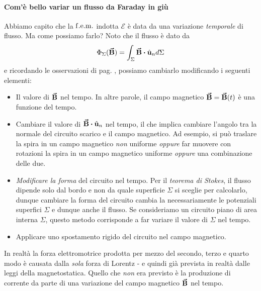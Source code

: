 \paragraph{Com'è bello variar un flusso da Faraday in giù}
Abbiamo capito che la $\mathrm{f.e.m.}$ indotta $\mathcal{E}$ è data da una variazione \textit{temporale} di flusso. Ma come possiamo farlo? Noto che il flusso è dato da
\begin{equation*}
	\Phi_\Sigma(\vba B)=\int_\Sigma \vba B\vdot \vbh{u}_n d\Sigma	
\end{equation*}
e ricordando le osservazioni di pag. \pageref{osservazioniFaraday}, possiamo cambiarlo modificando i seguenti elementi:
\begin{itemize}
	\item Il valore di $\vb*{\va{B}}$ nel tempo. In altre parole, il campo magnetico $\vb*{\va{B}}=\vb*{\va{B}}(t)$ è una funzione del tempo.
	\item Cambiare il valore di $\vba{B}\vdot \vbh{u}_n$ nel tempo, il che implica cambiare l'angolo tra la normale del circuito scarico e il campo magnetico. Ad esempio, si può traslare la spira in un campo magnetico \textit{non} uniforme \textit{oppure} far muovere con rotazioni la spira in un campo magnetico uniforme \textit{oppure} una combinazione delle due. 
	\item \textit{Modificare la forma} del circuito nel tempo. Per il \textit{teorema di Stokes}, il flusso dipende solo dal bordo e non da quale superficie $\Sigma$ si sceglie per calcolarlo, dunque cambiare la forma del circuito cambia la necessariamente le potenziali superfici $\Sigma$ e dunque anche il flusso. Se consideriamo un circuito piano di area interna $\Sigma$, questo metodo corrisponde a far variare il valore di $\Sigma$ nel tempo.
	\item Applicare uno spostamento rigido del circuito nel campo magnetico.
\end{itemize}
In realtà la forza elettromotrice prodotta per mezzo del secondo, terzo e quarto modo è causata dalla \textit{sola} forza di Lorentz - e quindi già prevista in realtà dalle leggi della magnetostatica. Quello che \textit{non} era previsto è la produzione di corrente da parte di una variazione del campo magnetico $\vb*{\va{B}}$ nel tempo.

